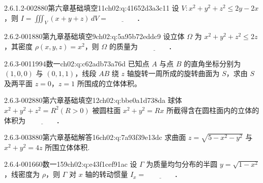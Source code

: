 \begin{q}{2.6.1.2-002}{880第六章基础填空11}{ch02:q:41652d3a3c11}
设 $V:x^2+y^2+z^2\leqslant 2y-2x$，则 $\displaystyle I=\iiint_V (x+y+z)\,dV= \underline{\hspace{4em}}$．
\end{q}

\par\addvspace{2.4ex}\noindent
\begin{minipage}{\linewidth}

\begin{q}{2.6.2-001}{880第九章基础填空9}{ch02:q:5a95b72eddc9}
设立体 $\Omega$ 为 $x^2+y^2+z^2\le 2z$，其密度 $\rho(x,y,z)=x^2$，则 $\Omega$ 的质量为 $\underline{\hspace{4em}}$．
\end{q}
\end{minipage}


\par\addvspace{2.4ex}\noindent
\begin{minipage}{\linewidth}

\begin{q}{2.6.3-001}{1994数一}{ch02:q:c62adb73a76d}
已知点 $A$ 与点 $B$ 的直角坐标分别为 $(1,0,0)$ 与 $(0,1,1)$，线段 $AB$ 绕 $z$ 轴旋转一周所成的旋转曲面为 $S$，求由 $S$ 及两平面 $z=0$，$z=1$ 所围成的立体体积。
\end{q}
\end{minipage}


\begin{q}{2.6.3-002}{880第六章基础填空12}{ch02:q:bbe0a1d738da}
球体 $x^2+y^2+z^2=R^2(R>0)$ 被圆柱面 $x^2+y^2=Rx$ 所截得含在圆柱面内的立体的体积为 $\underline{\hspace{4em}}$．
\end{q}

\begin{q}{2.6.3-003}{880第六章基础解答16}{ch02:q:7a93f39e13dc}
求曲面 $z=\sqrt{5-x^2-y^2}$ 与 $x^2+y^2=4z$ 所围立体体积.
\end{q}

\par\addvspace{2.4ex}\noindent
\begin{minipage}{\linewidth}

\begin{q}{2.6.4-001}{660数一159}{ch02:q:e43f1cef91ac}
设 $\Gamma$ 为质量均匀分布的半圆 $y=\sqrt{1-x^2}$，线密度为 $\rho$，则 $\Gamma$ 对 $x$ 轴的转动惯量 $I_x=\underline{\hspace{4em}}$．
\end{q}
\end{minipage}


